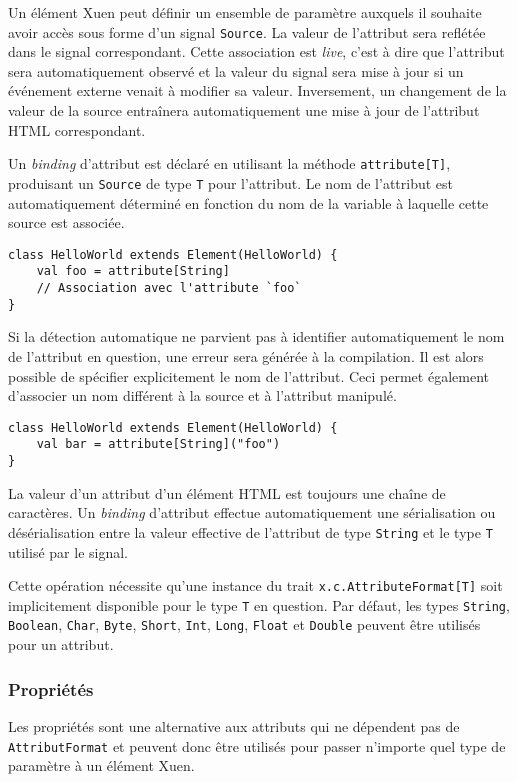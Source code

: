 Un élément Xuen peut définir un ensemble de paramètre auxquels il souhaite avoir accès sous forme d'un signal \texttt{Source}. La valeur de l'attribut sera reflétée dans le signal correspondant. Cette association est \emph{live}, c'est à dire que l'attribut sera automatiquement observé et la valeur du signal sera mise à jour si un événement externe venait à modifier sa valeur. Inversement, un changement de la valeur de la source entraînera automatiquement une mise à jour de l'attribut HTML correspondant.

Un \emph{binding} d'attribut est déclaré en utilisant la méthode \texttt{attribute[T]}, produisant un \texttt{Source} de type \texttt{T} pour l'attribut. Le nom de l'attribut est automatiquement déterminé en fonction du nom de la variable à laquelle cette source est associée.

\begin{lstlisting}
class HelloWorld extends Element(HelloWorld) {
	val foo = attribute[String]
	// Association avec l'attribute `foo`
}
\end{lstlisting}

Si la détection automatique ne parvient pas à identifier automatiquement le nom de l'attribut en question, une erreur sera générée à la compilation. Il est alors possible de spécifier explicitement le nom de l'attribut. Ceci permet également d'associer un nom différent à la source et à l'attribut manipulé.

\begin{lstlisting}
class HelloWorld extends Element(HelloWorld) {
	val bar = attribute[String]("foo")
}
\end{lstlisting}

La valeur d'un attribut d'un élément HTML est toujours une chaîne de caractères. Un \emph{binding} d'attribut effectue automatiquement une sérialisation ou désérialisation entre la valeur effective de l'attribut de type \texttt{String} et le type \texttt{T} utilisé par le signal.

Cette opération nécessite qu'une instance du trait \texttt{x.c.AttributeFormat[T]} soit implicitement disponible pour le type \texttt{T} en question. Par défaut, les types \texttt{String}, \texttt{Boolean}, \texttt{Char}, \texttt{Byte}, \texttt{Short}, \texttt{Int}, \texttt{Long}, \texttt{Float} et \texttt{Double} peuvent être utilisés pour un attribut.

\subsubsection{Propriétés}
Les propriétés sont une alternative aux attributs qui ne dépendent pas de \texttt{AttributFormat} et peuvent donc être utilisés pour passer n'importe quel type de paramètre à un élément Xuen. 

